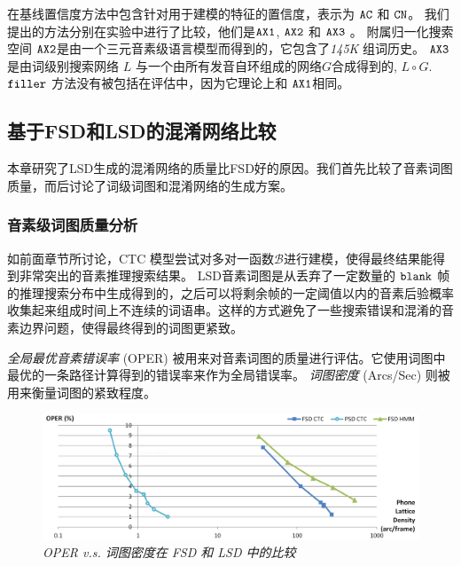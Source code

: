  在基线置信度方法中包含针对用于建模的特征的置信度，表示为 $\tt AC $ 和 $ \tt CN $。 我们提出的方法分别在实验中进行了比较，他们是$\tt AX1 $, $\tt AX2 $ 和 $\tt AX3 $ 。 
 附属归一化搜索空间 $\tt AX2 $是由一个三元音素级语言模型而得到的，它包含了{\em 145K} 组词历史。 $\tt AX3 $ 是由词级别搜索网络 $L$ 与一个由所有发音自环组成的网络$G$合成得到的,  $L \circ G$. $\tt filler$ 方法没有被包括在评估中，因为它理论上和 $\tt AX1$相同。

\subsection{基于FSD和LSD的混淆网络比较}
\label{sec:exp-lattice-ana}

本章研究了LSD生成的混淆网络的质量比FSD好的原因。我们首先比较了音素词图质量，而后讨论了词级词图和混淆网络的生成方案。


\subsubsection{音素级词图质量分析}

如前面章节所讨论，CTC 模型尝试对多对一函数$\mathcal{B}$进行建模，使得最终结果能得到非常突出的音素推理搜索结果。
LSD音素词图是从丢弃了一定数量的 $\tt blank$ 帧的推理搜索分布中生成得到的，之后可以将剩余帧的一定阈值以内的音素后验概率收集起来组成时间上不连续的词语串。这样的方式避免了一些搜索错误和混淆的音素边界问题，使得最终得到的词图更紧致。

{\em 全局最优音素错误率} (OPER) 被用来对音素词图的质量进行评估。它使用词图中最优的一条路径计算得到的错误率来作为全局错误率\cite{hoffmeister2006frame}。 {\em 词图密度} (Arcs/Sec) 则被用来衡量词图的紧致程度\cite{woodland1994large}。

\begin{figure}[tbhp!]
        \centering
        \includegraphics[width=\linewidth]{figure/OPER-latden.png}

        \caption{{\it OPER v.s. 词图密度在 FSD 和 LSD 中的比较}}
        \label{fig:OPER-latden}
      \end{figure}

